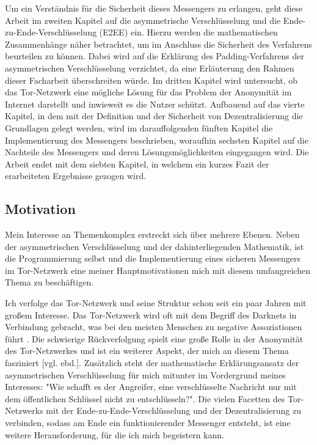\documentclass[a4paper,ngerman, headheight=28pt,12pt]{scrartcl}
\newcommand{\vcite}[1]{\cite[vgl.][]{#1}}
\newcommand{\vebd}{[vgl. ebd.]}
\begin{document}
Um ein Verständnis für die Sicherheit dieses Messengers zu erlangen, geht diese Arbeit im zweiten Kapitel auf die asymmetrische Verschlüsselung und die Ende-zu-Ende-Verschlüsselung (E2EE) ein. Hierzu werden die mathematischen Zusammenhänge näher betrachtet, um im Anschluss die Sicherheit des Verfahrens beurteilen zu können.
Dabei wird auf die Erklärung des Padding-Verfahrens der asymmetrischen Verschlüsselung verzichtet, da eine Erläuterung den Rahmen dieser Facharbeit überschreiten würde. Im dritten Kapitel wird untersucht, ob das Tor-Netzwerk eine mögliche Lösung für das Problem der Anonymität im Internet darstellt und inwieweit es die Nutzer schützt.
Aufbauend auf das vierte Kapitel, in dem mit der Definition und der Sicherheit von Dezentralisierung die Grundlagen gelegt werden, wird im darauffolgenden fünften Kapitel die Implementierung des Messengers beschrieben, woraufhin sechsten Kapitel auf die Nachteile des Messengers und deren Lösungsmöglichkeiten eingegangen wird. Die Arbeit endet mit dem siebten Kapitel, in welchem ein kurzes Fazit der erarbeiteten Ergebnisse gezogen wird.

\subsection{Motivation}
Mein Interesse an Themenkomplex erstreckt sich über mehrere Ebenen. Neben der asymmetrischen Verschlüsselung und der dahinterliegenden Mathematik, ist die Programmierung selbst und die Implementierung eines sicheren Messengers im Tor-Netzwerk eine meiner Hauptmotivationen mich mit diesem umfangreichen Thema zu beschäftigen.

Ich verfolge das Tor-Netzwerk und seine Struktur schon seit ein paar Jahren mit großem Interesse. Das Tor-Netzwerk wird oft mit dem Begriff des Darknets in Verbindung gebracht, was bei den meisten Menschen zu negative Assoziationen führt \vcite{BsiTorDarknet}. Die schwierige Rückverfolgung spielt eine große Rolle in der Anonymität des Tor-Netzwerkes und ist ein weiterer Aspekt, der mich an diesem Thema fasziniert \vebd.
Zusätzlich steht der mathematische Erklärungsansatz der asymmetrischen Verschlüsselung für mich mitunter im Vordergrund meines Interesses: "Wie schafft es der Angreifer, eine verschlüsselte Nachricht nur mit dem öffentlichen Schlüssel nicht zu entschlüsseln?".
Die vielen Facetten des Tor-Netzwerks mit der Ende-zu-Ende-Verschlüsselung und der Dezentralisierung zu verbinden, sodass am Ende ein funktionierender Messenger entsteht, ist eine weitere Herausforderung, für die ich mich begeistern kann.
\end{document}
